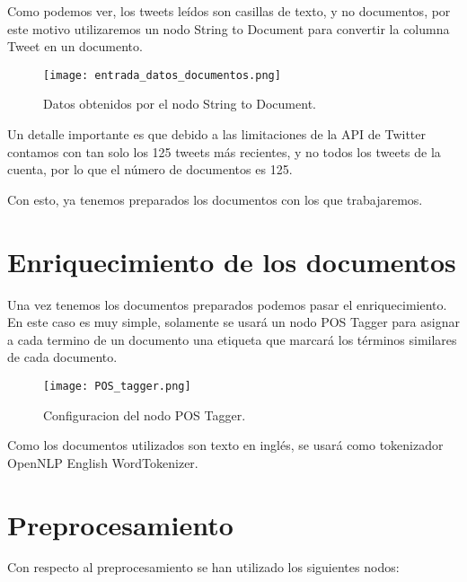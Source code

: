 Como podemos ver, los tweets leídos son casillas de texto, y no documentos, por este motivo utilizaremos un nodo String to Document para convertir la columna Tweet en un documento.


\begin{figure}[H]
	\centering
	\texttt{[image: entrada\_datos\_documentos.png]}
	\caption{Datos obtenidos por el nodo String to Document.}
	\label{fig:entrada_datos_documentos}
\end{figure}


Un detalle importante es que debido a las limitaciones de la API de Twitter contamos con tan solo los 125 tweets más recientes, y no todos los tweets de la cuenta, por lo que el número de documentos es 125.

Con esto, ya tenemos preparados los documentos con los que trabajaremos.

\section{Enriquecimiento de los documentos}

Una vez tenemos los documentos preparados podemos pasar el enriquecimiento. En este caso es muy simple, solamente se usará un nodo POS Tagger para asignar a cada termino de un documento una etiqueta que marcará los términos similares de cada documento.

\begin{figure}[H]
	\centering
	\texttt{[image: POS\_tagger.png]}
	\caption{Configuracion del nodo POS Tagger.}
	\label{fig:POStagger}
\end{figure}

Como los documentos utilizados son texto en inglés, se usará como tokenizador OpenNLP English WordTokenizer.


\section{Preprocesamiento}

Con respecto al preprocesamiento se han utilizado los siguientes nodos:

